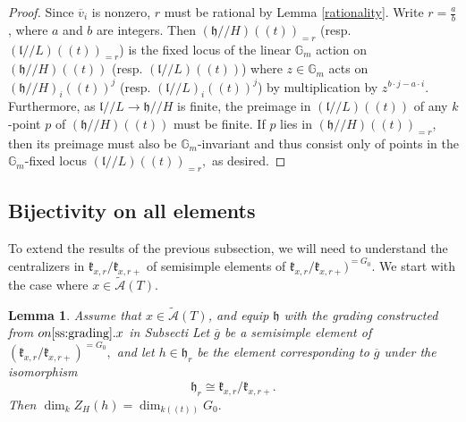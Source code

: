\documentclass[12pt]{article}
\newcommand{\on}{\operatorname}
\newtheorem{lemma}[theorem]{Lemma}
\theoremstyle{remark}
\begin{document}
\begin{proof}
Since $\overline{v}_i$ is nonzero, $r$ must be rational by Lemma \ref{rationality}. Write $r=\frac{a}{b}$, where $a$ and $b$ are integers. Then $(\mathfrak{h}//H)((t))_{=r}$ (resp. $(\mathfrak{l}//L)((t))_{=r}$) is the fixed locus of the linear $\mathbb{G}_m$ action on $(\mathfrak{h}//H)((t))$ (resp. $(\mathfrak{l}//L)((t))$) where $z\in\mathbb{G}_m$ acts on $(\mathfrak{h}//H)_i((t))^j$ (resp. $(\mathfrak{l}//L)_i((t))^j$) by multiplication by $z^{b\cdot j-a\cdot i}$. Furthermore, as $\mathfrak{l}//L\rightarrow\mathfrak{h}//H$ is finite, the preimage in $(\mathfrak{l}//L)((t))$ of any $k$-point $p$ of $(\mathfrak{h}//H)((t))$ must be finite. If $p$ lies in $(\mathfrak{h}//H)((t))_{=r}$, then its preimage must also be $\mathbb{G}_m$-invariant and thus consist only of points in the $\mathbb{G}_m$-fixed locus $(\mathfrak{l}//L)((t))_{=r},$ as desired.

\end{proof}

\subsection{Bijectivity on all elements}
To extend the results of the previous subsection, we will need to understand the centralizers in $\mathfrak{k}_{x,r}/\mathfrak{k}_{x,r+}$ of semisimple elements of $\mathfrak{k}_{x,r}/\mathfrak{k}_{x,r+})^{=G_0}$. We start with the case where $x\in\widetilde{\mathcal{A}}(T)$.

\begin{lemma}\label{finiteaffinecomparison}
Assume that $x\in\widetilde{\mathcal{A}}(T)$, and equip $\mathfrak{h}$ with the grading constructed from $on \ref{ss:grading}.x$ in Subsecti Let $\overline{g}$ be a semisimple element of $(\mathfrak{k}_{x,r}/\mathfrak{k}_{x,r+})^{=G_0},$ and let $h\in\mathfrak{h}_r$ be the element corresponding to $\overline{g}$ under the isomorphism
\[
\mathfrak{h}_r\cong \mathfrak{k}_{x,r}/\mathfrak{k}_{x,r+}.
\]
Then $\on{dim}_k Z_H(h)=\on{dim}_{k((t))}G_0.$
\end{lemma}
\end{document}
